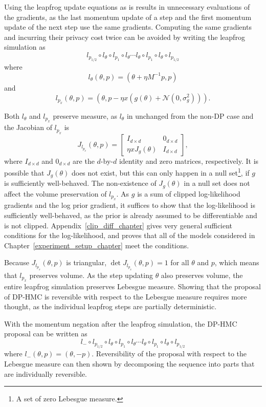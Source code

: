\documentclass[english,twoside,openright]{HYgraduMLDS}
\newcommand{\caln}{{\mathcal{N}}}
\begin{document}
Using the leapfrog update equations as is results in unnecessary evaluations
of the gradients, as the last momentum update of a step and the first momentum
update of the next step use the same gradients. Computing the same gradients
and incurring their privacy cost
twice can be avoided by writing the leapfrog simulation as
\[
  l_{p_{1/2}}\circ l_{\theta}\circ l_{p_{1}}\circ l_{\theta}\dotsb
  l_{\theta}\circ l_{p_{1}}\circ l_{\theta}\circ l_{p_{1/2}}
\]
where
\[
  l_{\theta}(\theta, p) = (\theta + \eta M^{-1}p, p)
\]
and
\[
  l_{p_{x}}(\theta, p) = (\theta, p - \eta x(g(\theta) + \caln(0, \sigma_{g}^2))).
\]

Both \(l_{\theta}\) and \(l_{p_{x}}\) preserve measure, as \(l_{\theta}\) in
unchanged from the non-DP case and the Jacobian of \(l_{p_{x}}\) is
\[
  J_{l_{p_{x}}}(\theta, p) =
  \begin{bmatrix}
    I_{d\times d} & 0_{d\times d} \\
    \eta xJ_{g}(\theta) & I_{d\times d}
  \end{bmatrix},
\]
where \(I_{d\times d}\) and \(0_{d\times d}\) are the \(d\)-by-\(d\) identity and
zero matrices, respectively.
It is possible that \(J_{g}(\theta)\) does not exist, but this can only happen
in a null set\footnote{A set of zero Lebesgue measure.}, if \(g\) is
sufficiently well-behaved. The non-existence of \(J_{g}(\theta)\) in a null set
does not affect the volume preservation of \(l_{p_{x}}\).
As \(g\) is a sum of clipped log-likelihood
gradients and the log prior gradient, it suffices to show that the
log-likelihood is sufficiently well-behaved, as the prior is already assumed
to be differentiable and is not clipped. Appendix~\ref{clip_diff_chapter}
gives very general sufficient conditions for the log-likelihood, and proves
that all of the models considered in Chapter~\ref{experiment_setup_chapter} meet
the conditions.

Because \(J_{l_{p_{x}}}(\theta, p)\) is triangular, \(\det J_{l_{p_{x}}}(\theta, p) = 1\)
for all \(\theta\) and \(p\), which means that \(l_{p_{x}}\) preserves volume.
As the step updating \(\theta\) also preserves volume, the entire leapfrog
simulation preserves Lebesgue measure. Showing that the proposal of
DP-HMC is reversible
with respect to the Lebesgue measure requires more thought, as the individual
leapfrog steps are partially deterministic.

With the momentum negation after the leapfrog simulation, the DP-HMC proposal
can be written as
\[
  l_{-}\circ l_{p_{1/2}}\circ l_{\theta}\circ l_{p_{1}}\circ l_{\theta}\dotsb
  l_{\theta}\circ l_{p_{1}}\circ l_{\theta}\circ l_{p_{1/2}}
\]
where \(l_{-}(\theta, p) = (\theta, -p)\). Reversibility of the proposal
with respect to the Lebesgue measure can then shown by
decomposing the sequence into parts that are individually reversible.
\end{document}
